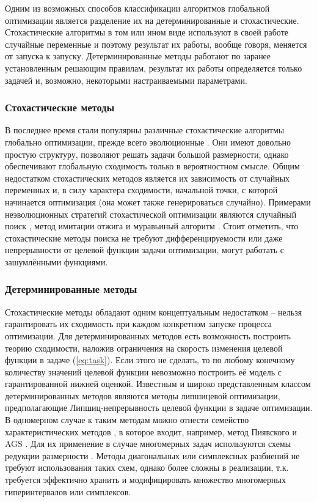 Одним из возможных способов классификации алгоритмов глобальной оптимизации является разделение их
на детерминированные и стохастические. Стохастические алгоритмы в том или ином виде используют в своей работе
случайные переменные и поэтому результат их работы, вообще говоря, меняется от запуска к запуску. Детерминированные методы
работают по заранее установленным решающим правилам, результат их работы определяется только задачей и,
возможно, некоторыми настраиваемыми параметрами.

\subsubsection{Стохастические методы}

В последнее время стали популярны различные стохастические алгоритмы глобально оптимизации,
прежде всего эволюционные \cite{Storn1997, SCHLUTER2009, KennedyEberhart1995}. 
Они имеют довольно простую структуру, позволяют решать задачи большой размерности,
однако обеспечивают глобальную сходимость только в вероятностном смысле. Общим недостатком
стохастических методов является их зависимость от случайных переменных и, в силу характера сходимости,
начальной точки, с которой начинается оптимизация (она может также генерироваться случайно).
Примерами неэволюционных стратегий стохастической оптимизации являются случайный поиск \cite{rastrigin1963},
метод имитации отжига \cite{XIANG1997216} и муравьиный алгоритм \cite{ZhangACO2008}. Стоит отметить, что
стохастические методы поиска не требуют дифференцируемости или даже непрерывности от целевой функции задачи оптимизации,
могут работать с зашумлёнными функциями.

\subsubsection{Детерминированные методы}

Стохастические методы обладают одним концептуальным недостатком -- нельзя гарантировать их сходимость при 
каждом конкретном запуске процесса оптимизации. Для детерминированных методов есть возможность построить теорию сходимости,
наложив ограничения на скорость изменения целевой функции в задаче (\ref{eq:task}). Если этого не сделать, то
по любому конечному количеству значений целевой функции невозможно построить её модель с гарантированной нижней оценкой.
Известным и широко представленным классом детерминированных методов являются методы липшицевой оптимизации, предполагающие
Липшиц-непрерывность целевой функции в задаче оптимизации. В одномерном случае к таким методам можно отнести семейство
характеристических методов \cite{gorodetsky2007}, в которое входит, например, метод Пиявского \cite{pijavsky1972} и AGS \cite{strongin1978}.
Для их применение в случае многомерных задач используются схемы редукции размерности \cite{strongin1978}.
Методы диагональных \cite{Sergeyev2015} или симплексных \cite{Zilinskas2014} разбиений не требуют использования 
таких схем, однако более сложны в реализации, т.к. требуется эффектично хранить и модифицировать множество многомерных гиперинтервалов
или симплексов.

